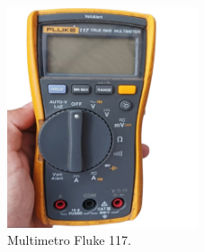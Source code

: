 \documentclass[a4paper,12pt]{article} %
\begin{document}
        \begin{figure}[h] %
            \centering
            \includegraphics[width=0.5\textwidth]{img/Multimetro digital.png} %
            \caption{Multimetro Fluke 117.}
            \label{fig:MulDigital}
        \end{figure}
\end{document}
